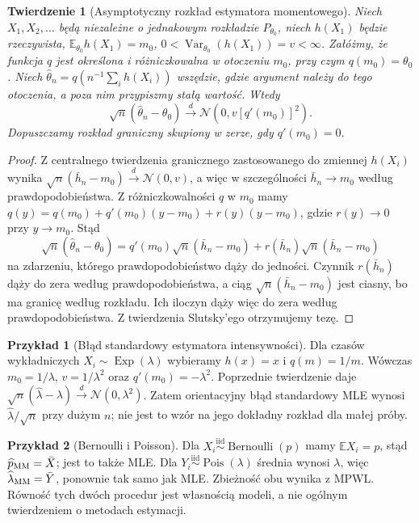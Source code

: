 \documentclass[11pt,a4paper,oneside]{report}
\numberwithin{equation}{chapter}
\theoremstyle{plain}
\newtheorem{twierdzenie}{Twierdzenie}[chapter]
\theoremstyle{definition}
\newtheorem{przyklad}{Przykład}[chapter]
\theoremstyle{remark}
\newcommand{\E}{\mathbb E}
\newcommand{\Var}{\operatorname{Var}}
\newcommand{\Normal}{\mathcal N}
\newcommand{\iid}{\mathrel{\overset{\mathrm{iid}}\sim}}
\DeclareMathOperator{\Pois}{Pois}
\begin{document}
\begin{twierdzenie}[Asymptotyczny rozkład estymatora momentowego]
\label{thm:mom-clt}
Niech $X_1,X_2,\ldots$ będą niezależne o jednakowym rozkładzie
$P_{\theta_0}$, niech $h(X_1)$ będzie rzeczywista,
$\E_{\theta_0}h(X_1)=m_0$, $0<\Var_{\theta_0}(h(X_1))=v<\infty$.
Załóżmy, że funkcja $q$ jest określona i różniczkowalna w otoczeniu
$m_0$, przy czym $q(m_0)=\theta_0$. Niech
$\widehat\theta_n=q(n^{-1}\sum_i h(X_i))$ wszędzie, gdzie argument
należy do tego otoczenia, a poza nim przypiszmy stałą wartość.
Wtedy
\[
\sqrt n(\widehat\theta_n-\theta_0)
\xrightarrow{d}\Normal(0,v[q'(m_0)]^2).
\]
Dopuszczamy rozkład graniczny skupiony w zerze, gdy $q'(m_0)=0$.
\end{twierdzenie}
\begin{proof}
Z centralnego twierdzenia granicznego zastosowanego do zmiennej
$h(X_i)$ wynika
$\sqrt n(\bar h_n-m_0)\xrightarrow{d}\Normal(0,v)$,
a więc w szczególności $\bar h_n\to m_0$ według
prawdopodobieństwa. Z różniczkowalności $q$ w $m_0$ mamy
$q(y)=q(m_0)+q'(m_0)(y-m_0)+r(y)(y-m_0)$,
gdzie $r(y)\to0$ przy $y\to m_0$.
Stąd
\[
\sqrt n(\widehat\theta_n-\theta_0)
=q'(m_0)\sqrt n(\bar h_n-m_0)
+r(\bar h_n)\sqrt n(\bar h_n-m_0)
\]
na zdarzeniu, którego prawdopodobieństwo dąży do jedności.
Czynnik $r(\bar h_n)$ dąży do zera według prawdopodobieństwa,
a ciąg $\sqrt n(\bar h_n-m_0)$ jest ciasny, bo ma granicę
według rozkładu. Ich iloczyn dąży więc do zera według
prawdopodobieństwa. Z twierdzenia Slutsky'ego otrzymujemy tezę.
\end{proof}
\begin{przyklad}[Błąd standardowy estymatora intensywności]
Dla czasów wykładniczych $X_i\sim\operatorname{Exp}(\lambda)$
wybieramy $h(x)=x$ i $q(m)=1/m$. Wówczas
$m_0=1/\lambda$, $v=1/\lambda^2$ oraz
$q'(m_0)=-\lambda^2$. Poprzednie twierdzenie daje
$\sqrt n(\widehat\lambda-\lambda)\xrightarrow{d}
\Normal(0,\lambda^2)$. Zatem orientacyjny błąd standardowy MLE
wynosi $\widehat\lambda/\sqrt n$ przy dużym $n$;
nie jest to wzór na jego dokładny rozkład dla małej próby.
\end{przyklad}

\begin{przyklad}[Bernoulli i Poisson]
Dla $X_i\iid\operatorname{Bernoulli}(p)$ mamy $\E X_i=p$, stąd
$\widehat p_{\rm MM}=\bar X$; jest to także MLE.
Dla $Y_i\iid\Pois(\lambda)$ średnia wynosi $\lambda$, więc
$\widehat\lambda_{\rm MM}=\bar Y$, ponownie tak samo jak MLE.
Zbieżność obu wynika z MPWL. Równość tych dwóch procedur jest
własnością modeli, a nie ogólnym twierdzeniem o metodach estymacji.
\end{przyklad}
\end{document}
